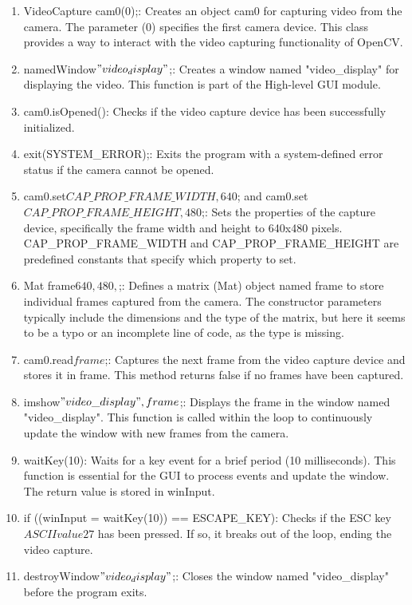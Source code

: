 \documentclass[a4paper,11pt]{article}%
\newenvironment{qanda}{\setlength{\parindent}{0pt}}{\bigskip}
\begin{document}
\begin{qanda}
\begin{enumerate}
			\begin{enumerate}
				\item VideoCapture cam0(0);: Creates an object cam0 for capturing video from the camera. The parameter (0) specifies the first camera device. This class provides a way to interact with the video capturing functionality of OpenCV.
				\item namedWindow\("video_display"\);: Creates a window named "video\_display" for displaying the video. This function is part of the High-level GUI module.
				\item cam0.isOpened(): Checks if the video capture device has been successfully initialized.
				\item exit(SYSTEM\_ERROR);: Exits the program with a system-defined error status if the camera cannot be opened.
				\item cam0.set\(CAP\_PROP\_FRAME\_WIDTH, 640\); and cam0.set\(CAP\_PROP\_FRAME\_HEIGHT, 480\);: Sets the properties of the capture device, specifically the frame width and height to 640x480 pixels. CAP\_PROP\_FRAME\_WIDTH and CAP\_PROP\_FRAME\_HEIGHT are predefined constants that specify which property to set.
				\item Mat frame\(640, 480, \);: Defines a matrix (Mat) object named frame to store individual frames captured from the camera. The constructor parameters typically include the dimensions and the type of the matrix, but here it seems to be a typo or an incomplete line of code, as the type is missing.
				\item cam0.read\(frame\);: Captures the next frame from the video capture device and stores it in frame. This method returns false if no frames have been captured.
				\item imshow\("video\_display", frame\);: Displays the frame in the window named "video\_display". This function is called within the loop to continuously update the window with new frames from the camera.
				\item waitKey(10): Waits for a key event for a brief period (10 milliseconds). This function is essential for the GUI to process events and update the window. The return value is stored in winInput.
				\item if ((winInput = waitKey(10)) == ESCAPE\_KEY): Checks if the ESC key \(ASCII value 27\) has been pressed. If so, it breaks out of the loop, ending the video capture.
				\item destroyWindow\("video_display"\);: Closes the window named "video\_display" before the program exits.
			\end{enumerate}
		

\end{enumerate}
\end{qanda}
\end{document}

